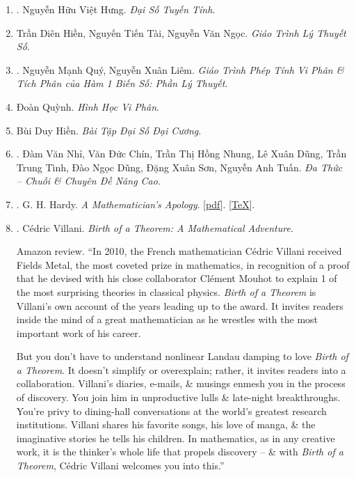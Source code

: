 \documentclass{article}
\begin{document}
\begin{enumerate}
	\item \cite{Hung_linear_algebra}. {\sc Nguyễn Hữu Việt Hưng}. {\it Đại Số Tuyến Tính}.\hfill{\sf[reading]}
	
	\item Trần Diên Hiền, Nguyến Tiến Tài, Nguyễn Văn Ngọc. {\it Giáo Trình Lý Thuyết Số}.
	
	\item \cite{Quy_Liem2012}. Nguyễn Mạnh Quý, Nguyễn Xuân Liêm. {\it Giáo Trình Phép Tính Vi Phân \& Tích Phân của Hàm 1 Biến Số: Phần Lý Thuyết}.\hfill{\sf[reading]}
	
	\item Đoàn Quỳnh. {\it Hình Học Vi Phân}.
	
	\item Bùi Duy Hiền. {\it Bài Tập Đại Số Đại Cương}.
	
	\item \cite{Nhi_Chin_Dung_Dung_Tinh_Dung_Son_Tuan2017}. Đàm Văn Nhỉ, Văn Đức Chín, Trần Thị Hồng Nhung, Lê Xuân Dũng, Trần Trung Tình, Đào Ngọc Dũng, Đặng Xuân Sơn, Nguyễn Anh Tuấn. {\it Đa Thức -- Chuỗi \& Chuyên Đề Nâng Cao}.
	
	\item \cite{Hardy1940, Hardy1992, Hardy2022}. G. H. Hardy. {\it A Mathematician's Apology}. [\href{https://github.com/NQBH/hobby/blob/master/advanced_mathematics/Hardy2017/NQBH_Hardy2017.pdf}{pdf}]. [\href{https://github.com/NQBH/hobby/blob/master/advanced_mathematics/Hardy2017/NQBH_Hardy2017.tex}{\TeX}].\hfill{\sf[done]}
	
	\item \cite{Villani2015}. {\sc C\'edric Villani}. {\it Birth of a Theorem: A Mathematical Adventure}. {}
	
	{\sf Amazon review.} ``In 2010, the French mathematician {\sc C\'edric Villani} received Fields Metal, the most coveted prize in mathematics, in recognition of a proof that he devised with his close collaborator {\sc Cl\'ement Mouhot} to explain 1 of the most surprising theories in classical physics. {\it Birth of a Theorem} is {\sc Villani}'s own account of the years leading up to the award. It invites readers inside the mind of a great mathematician as he wrestles with the most important work of his career.
	
	But you don't have to understand nonlinear Landau damping to love {\it Birth of a Theorem}. It doesn't simplify or overexplain; rather, it invites readers into a collaboration. {\sc Villani}'s diaries, e-mails, \& musings enmesh you in the process of discovery. You join him in unproductive lulls \& late-night breakthroughs. You're privy to dining-hall conversations at the world's greatest research institutions. {\sc Villani} shares his favorite songs, his love of manga, \& the imaginative stories he tells his children. In mathematics, as in any creative work, it is the thinker's whole life that propels discovery -- \& with {\it Birth of a Theorem}, {\sc C\'edric Villani} welcomes you into this.''
	

\end{enumerate}
\end{document}
